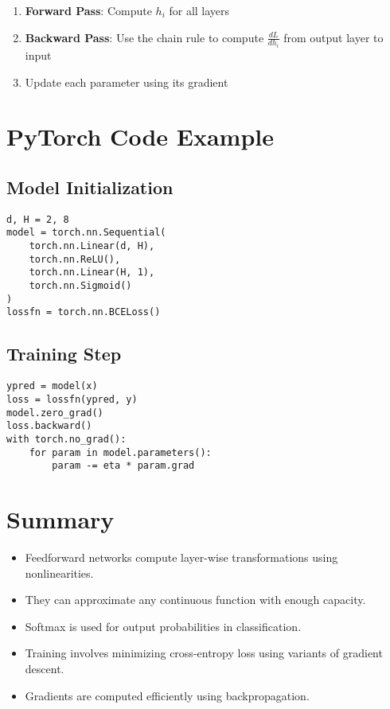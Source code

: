 \documentclass[11pt]{article}
\begin{document}
\begin{enumerate}
    \item \textbf{Forward Pass}: Compute $h_i$ for all layers
    \item \textbf{Backward Pass}: Use the chain rule to compute $\frac{dL}{dh_i}$ from output layer to input
    \item Update each parameter using its gradient
\end{enumerate}

\section{PyTorch Code Example}

\subsection*{Model Initialization}
\begin{verbatim}
d, H = 2, 8
model = torch.nn.Sequential(
    torch.nn.Linear(d, H),
    torch.nn.ReLU(),
    torch.nn.Linear(H, 1),
    torch.nn.Sigmoid()
)
lossfn = torch.nn.BCELoss()
\end{verbatim}

\subsection*{Training Step}
\begin{verbatim}
ypred = model(x)
loss = lossfn(ypred, y)
model.zero_grad()
loss.backward()
with torch.no_grad():
    for param in model.parameters():
        param -= eta * param.grad
\end{verbatim}

\section{Summary}

\begin{itemize}
    \item Feedforward networks compute layer-wise transformations using nonlinearities.
    \item They can approximate any continuous function with enough capacity.
    \item Softmax is used for output probabilities in classification.
    \item Training involves minimizing cross-entropy loss using variants of gradient descent.
    \item Gradients are computed efficiently using backpropagation.
\end{itemize}
\end{document}
